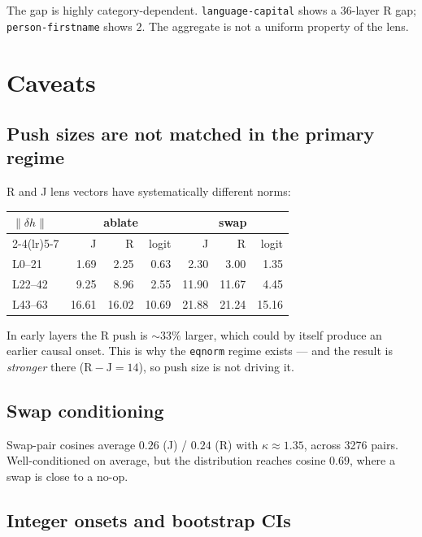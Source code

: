 \documentclass[11pt,a4paper]{article}
\begin{document}
\noindent
The gap is highly category-dependent. \texttt{language-capital} shows a $36$-layer R
gap; \texttt{person-firstname} shows $2$. The aggregate is not a uniform property of
the lens.

\section{Caveats}

\subsection{Push sizes are not matched in the primary regime}
\label{sec:pushsize}

R and J lens vectors have systematically different norms:

\begin{center}
\begin{tabular}{@{}lrrrrrr@{}}
\toprule
$\|\delta h\|$ & \multicolumn{3}{c}{\textbf{ablate}} & \multicolumn{3}{c}{\textbf{swap}} \\
\cmidrule(lr){2-4}\cmidrule(lr){5-7}
 & J & R & logit & J & R & logit \\
\midrule
L0--21  & 1.69 & 2.25 & 0.63 & 2.30 & 3.00 & 1.35 \\
L22--42 & 9.25 & 8.96 & 2.55 & 11.90 & 11.67 & 4.45 \\
L43--63 & 16.61 & 16.02 & 10.69 & 21.88 & 21.24 & 15.16 \\
\bottomrule
\end{tabular}
\end{center}

\noindent
In early layers the R push is $\sim33\%$ larger, which could by itself produce an
earlier causal onset. This is why the \texttt{eqnorm} regime exists --- and the result
is \emph{stronger} there ($\text{R}-\text{J} = 14$), so push size is not driving it.

\subsection{Swap conditioning}

Swap-pair cosines average $0.26$ (J) / $0.24$ (R) with $\kappa \approx 1.35$, across
3276 pairs. Well-conditioned on average, but the distribution reaches cosine $0.69$,
where a swap is close to a no-op.

\subsection{Integer onsets and bootstrap CIs}
\end{document}
